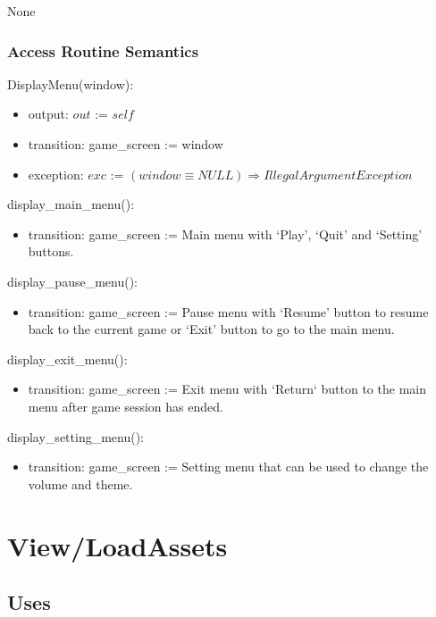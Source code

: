 \documentclass[12pt]{article}
\begin{document}
None

\subsubsection* {Access Routine Semantics}

DisplayMenu(window):
\begin{itemize}
    \item output: $out$ := $self$
    \item transition: game\_screen := window
    \item exception: $exc$ := $(window \equiv NULL) \Rightarrow IllegalArgumentException $
\end{itemize}

\noindent display\_main\_menu():
\begin{itemize}
    \item transition: game\_screen := Main menu with `Play', `Quit' and `Setting' buttons.
\end{itemize}

\noindent display\_pause\_menu():
\begin{itemize}
    \item transition: game\_screen := Pause menu with `Resume' button to resume back to the current game or `Exit' button to go to the main menu.
\end{itemize}

\noindent display\_exit\_menu():
\begin{itemize}
    \item transition: game\_screen := Exit menu with `Return` button to the main menu after game session has ended.
\end{itemize}

\noindent display\_setting\_menu():
\begin{itemize}
    \item transition: game\_screen := Setting menu that can be used to change the volume and theme.
\end{itemize}
\newpage
\section*{View/LoadAssets}

\subsection* {Uses}
\end{document}

